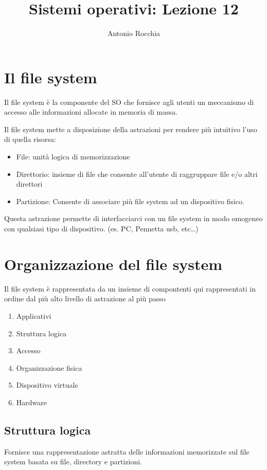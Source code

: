 \documentclass
[10pt,        %
 a4paper,     %
 onecolumn,   %
 fleqn,       %
 oneside,     %
 notitlepage, %
]{article}    %
\title{Sistemi operativi: Lezione 12}
\author{Antonio Rocchia}
\begin{document}
\maketitle          
\tableofcontents %

\section{Il file system}
Il file system è la componente del SO che fornisce agli utenti un meccanismo di accesso alle informazioni allocate in memoria di massa.

Il file system mette a disposizione della astrazioni per rendere più intuitivo l'uso di quella risorsa:
\begin{itemize}
    \item File: unità logica di memorizzazione
    \item Direttorio: insieme di file che consente all'utente di raggruppare file e/o altri direttori
    \item Partizione: Consente di associare più file system ad un dispositivo fisico.
\end{itemize}

Questa astrazione permette di interfacciarci con un file system in modo omogeneo con qualsiasi tipo di dispositivo. (es. PC, Pennetta usb, etc\ldots)

\section{Organizzazione del file system}
Il file system è rappresentata da un insieme di compontenti qui rappresentati in ordine dal più alto livello di astrazione al più passo
\begin{enumerate}
    \item Applicativi
    \item Struttura logica
    \item Accesso
    \item Organizzazione fisica
    \item Dispositivo virtuale
    \item Hardware
\end{enumerate}

\subsection{Struttura logica}
Fornisce una rappresentazione astratta delle informazioni memorizzate sul file system basata su file, directory e partizioni.
\end{document}
